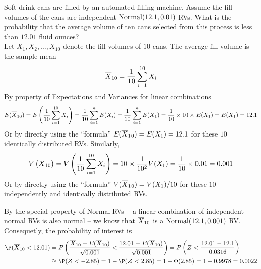 \begin{ExerciseList}
\Exercise
Soft drink cans are filled by an automated filling machine.  
Assume the fill volumes of the cans are independent $\mbox{{\rm Normal}}(12.1,0.01)$ RVs.  
What is the probability that the average volume of ten cans selected from this process is less than $12.01$ fluid ounces?
\Answer
~\\
Let $X_1,X_2,\ldots,X_{10}$ denote the fill volumes of $10$ cans.  The average fill volume is the sample mean
\[
\overline{X}_{10} = \frac{1}{10} \sum_{i=1}^{10} X_i
\]
By property of Expectations and Variances for linear combinations
\[
E(\overline{X}_{10}) = E \left(\frac{1}{10} \sum_{i=1}^{10} X_i \right) = \frac{1}{10}\sum_{i=1}^nE(X_i) = \frac{1}{10}\sum_{i=1}^nE(X_1) = \frac{1}{10} \times 10 \times E(X_1) = E(X_1) = 12.1
\]
Or by directly using the ``formula'' $E(\overline{X}_{10}) = E(X_1)=12.1$ for these $10$ identically distributed RVs.  
Similarly, 
\[
V\left(\overline{X}_{10}\right) = V \left(\frac{1}{10} \sum_{i=1}^{10} X_i \right) = 10 \times \frac{1}{10^2} V(X_1) = \frac{1}{10} \times 0.01 = 0.001 
\]
Or by directly using the ``formula'' $V(\overline{X}_{10}) = V(X_1)/10$ for these $10$ independently and identically distributed RVs.
 
By the special property of Normal RVs -- a linear combination of independent normal RVs is also normal -- we know that 
$\overline{X}_{10}$ is a $\mbox{{\rm Normal}}(12.1,0.001)$ RV.
Consequetly, the probability of interest is
\begin{align*}
\P(\ol{X}_{10} < 12.01) 
&= P \left( \frac{\ol{X}_{10}-E(\ol{X}_{10})}{\sqrt{0.001}} < \frac{12.01 - E(\ol{X}_{10})}{\sqrt{0.001}} \right) = P\left(Z < \frac{12.01-12.1}{0.0316}\right)\\ 
&\approxeq \P(Z<-2.85) = 1-\P(Z<2.85) = 1-\Phi(2.85) = 1-0.9978=0.0022
\end{align*}


\end{ExerciseList}
